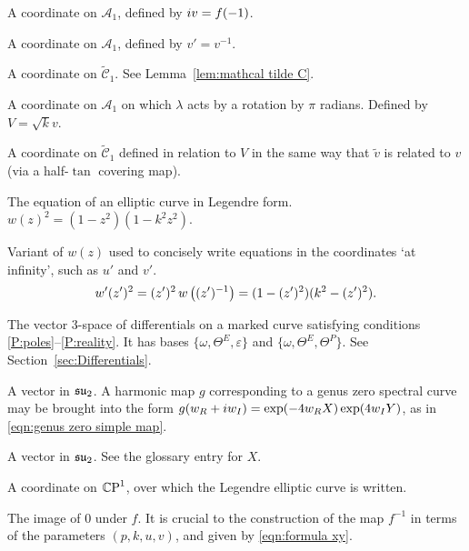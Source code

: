 \begin{description}[align=right]
\item[$v$] A coordinate on $\mathcal{A}_1$, defined by $i v = f(-1)$.

\item[$v'$] A coordinate on $\mathcal{A}_1$, defined by $v' = v^{-1}$.

\item[$\tilde{v}$] A coordinate on $\mathcal{\tilde{C}}_1$. See Lemma~\ref{lem:mathcal tilde C}.

\item[$V$] A coordinate on $\mathcal{A}_1$ on which $λ$ acts by a rotation by $π$ radians. Defined by $V=\sqrt{k} v$.

\item[$\tilde{V}$] A coordinate on $\mathcal{\tilde{C}}_1$ defined in relation to $V$ in the same way that $\tilde{v}$ is related to $v$ (via a half-$\tan$ covering map).

\item[$w(z)$] The equation of an elliptic curve in Legendre form. $w(z)^2 = (1-z^2)(1-k^2z^2)$.

\item[$w'(z')$] Variant of $w(z)$ used to concisely write equations in the coordinates `at infinity', such as $u'$ and $v'$.
\[
w'(z')^2 = (z')^2\,w\left((z')^{-1}\right) =  (1-(z')^2)(k^2 - (z')^2).
\]

\item[$W$] The vector $3$-space of differentials on a marked curve satisfying conditions \ref{P:poles}--\ref{P:reality}. It has bases $\{ ω, Θ^E, ε \}$ and $\{ ω, Θ^E, Θ^P \}$. See Section~\ref{sec:Differentials}.

\item[$x$]

\item[$X$] A vector in $\mathfrak{su}_2$. A harmonic map $g$ corresponding to a genus zero spectral curve may be brought into the form $g(w_R + i w_I) = \exp (-4w_R X) \exp (4w_I Y)$, as in \eqref{eqn:genus zero simple map}.

\item[$Y$] A vector in $\mathfrak{su}_2$. See the glossary entry for $X$.

\item[$z$] A coordinate on $\CP^1$, over which the Legendre elliptic curve is written.

\item[$z_0$] The image of $0$ under $f$. It is crucial to the construction of the map $f^{-1}$ in terms of the parameters $(p,k,u,v)$, and given by \eqref{eqn:formula xy}.







\end{description}
